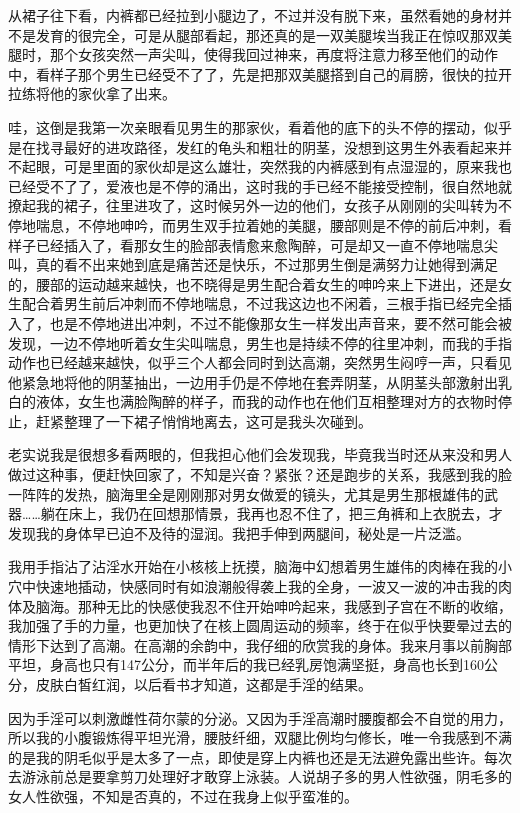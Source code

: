 \documentclass[12pt,UTF8]{ctexbook}
\begin{document}
从裙子往下看，内裤都已经拉到小腿边了，不过并没有脱下来，虽然看她的身材并不是发育的很完全，可是从腿部看起，那还真的是一双美腿埃当我正在惊叹那双美腿时，那个女孩突然一声尖叫，使得我回过神来，再度将注意力移至他们的动作中，看样子那个男生已经受不了了，先是把那双美腿搭到自己的肩膀，很快的拉开拉练将他的家伙拿了出来。

哇，这倒是我第一次亲眼看见男生的那家伙，看着他的底下的头不停的摆动，似乎是在找寻最好的进攻路径，发红的龟头和粗壮的阴茎，没想到这男生外表看起来并不起眼，可是里面的家伙却是这么雄壮，突然我的内裤感到有点湿湿的，原来我也已经受不了了，爱液也是不停的涌出，这时我的手已经不能接受控制，很自然地就撩起我的裙子，往里进攻了，这时候另外一边的他们，女孩子从刚刚的尖叫转为不停地喘息，不停地呻吟，而男生双手拉着她的美腿，腰部则是不停的前后冲刺，看样子已经插入了，看那女生的脸部表情愈来愈陶醉，可是却又一直不停地喘息尖叫，真的看不出来她到底是痛苦还是快乐，不过那男生倒是满努力让她得到满足的，腰部的运动越来越快，也不晓得是男生配合着女生的呻吟来上下进出，还是女生配合着男生前后冲刺而不停地喘息，不过我这边也不闲着，三根手指已经完全插入了，也是不停地进出冲刺，不过不能像那女生一样发出声音来，要不然可能会被发现，一边不停地听着女生尖叫喘息，男生也是持续不停的往里冲刺，而我的手指动作也已经越来越快，似乎三个人都会同时到达高潮，突然男生闷哼一声，只看见他紧急地将他的阴茎抽出，一边用手仍是不停地在套弄阴茎，从阴茎头部激射出乳白的液体，女生也满脸陶醉的样子，而我的动作也在他们互相整理对方的衣物时停止，赶紧整理了一下裙子悄悄地离去，这可是我头次碰到。

老实说我是很想多看两眼的，但我担心他们会发现我，毕竟我当时还从来没和男人做过这种事，便赶快回家了，不知是兴奋？紧张？还是跑步的关系，我感到我的脸一阵阵的发热，脑海里全是刚刚那对男女做爱的镜头，尤其是男生那根雄伟的武器……躺在床上，我仍在回想那情景，我再也忍不住了，把三角裤和上衣脱去，才发现我的身体早已迫不及待的湿润。我把手伸到两腿间，秘处是一片泛滥。

我用手指沾了沾淫水开始在小核核上抚摸，脑海中幻想着男生雄伟的肉棒在我的小穴中快速地插动，快感同时有如浪潮般得袭上我的全身，一波又一波的冲击我的肉体及脑海。那种无比的快感使我忍不住开始呻吟起来，我感到子宫在不断的收缩，我加强了手的力量，也更加快了在核上圆周运动的频率，终于在似乎快要晕过去的情形下达到了高潮。在高潮的余韵中，我仔细的欣赏我的身体。我来月事以前胸部平坦，身高也只有147公分，而半年后的我已经乳房饱满坚挺，身高也长到160公分，皮肤白皙红润，以后看书才知道，这都是手淫的结果。

因为手淫可以刺激雌性荷尔蒙的分泌。又因为手淫高潮时腰腹都会不自觉的用力，所以我的小腹锻炼得平坦光滑，腰肢纤细，双腿比例均匀修长，唯一令我感到不满的是我的阴毛似乎是太多了一点，即使是穿上内裤也还是无法避免露出些许。每次去游泳前总是要拿剪刀处理好才敢穿上泳装。人说胡子多的男人性欲强，阴毛多的女人性欲强，不知是否真的，不过在我身上似乎蛮准的。
\end{document}
